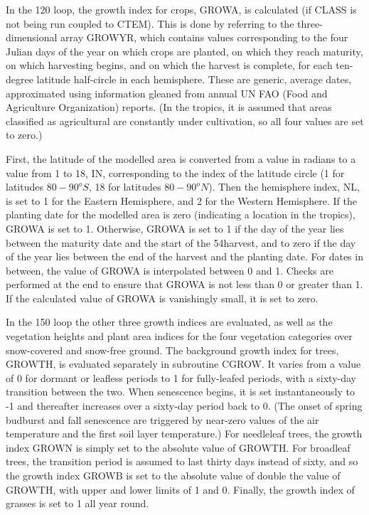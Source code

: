 In the 120 loop, the growth index for crops, G\+R\+O\+W\+A, is calculated (if C\+L\+A\+S\+S is not being run coupled to C\+T\+E\+M). This is done by referring to the three-\/dimensional array G\+R\+O\+W\+Y\+R, which contains values corresponding to the four Julian days of the year on which crops are planted, on which they reach maturity, on which harvesting begins, and on which the harvest is complete, for each ten-\/degree latitude half-\/circle in each hemisphere. These are generic, average dates, approximated using information gleaned from annual U\+N F\+A\+O (Food and Agriculture Organization) reports. (In the tropics, it is assumed that areas classified as agricultural are constantly under cultivation, so all four values are set to zero.)

First, the latitude of the modelled area is converted from a value in radians to a value from 1 to 18, I\+N, corresponding to the index of the latitude circle (1 for latitudes $80-90^o S$, 18 for latitudes $80-90^o N$). Then the hemisphere index, N\+L, is set to 1 for the Eastern Hemisphere, and 2 for the Western Hemisphere. If the planting date for the modelled area is zero (indicating a location in the tropics), G\+R\+O\+W\+A is set to 1. Otherwise, G\+R\+O\+W\+A is set to 1 if the day of the year lies between the maturity date and the start of the 54harvest, and to zero if the day of the year lies between the end of the harvest and the planting date. For dates in between, the value of G\+R\+O\+W\+A is interpolated between 0 and 1. Checks are performed at the end to ensure that G\+R\+O\+W\+A is not less than 0 or greater than 1. If the calculated value of G\+R\+O\+W\+A is vanishingly small, it is set to zero.

In the 150 loop the other three growth indices are evaluated, as well as the vegetation heights and plant area indices for the four vegetation categories over snow-\/covered and snow-\/free ground. The background growth index for trees, G\+R\+O\+W\+T\+H, is evaluated separately in subroutine C\+G\+R\+O\+W. It varies from a value of 0 for dormant or leafless periods to 1 for fully-\/leafed periods, with a sixty-\/day transition between the two. When senescence begins, it is set instantaneously to -\/1 and thereafter increases over a sixty-\/day period back to 0. (The onset of spring budburst and fall senescence are triggered by near-\/zero values of the air temperature and the first soil layer temperature.) For needleleaf trees, the growth index G\+R\+O\+W\+N is simply set to the absolute value of G\+R\+O\+W\+T\+H. For broadleaf trees, the transition period is assumed to last thirty days instead of sixty, and so the growth index G\+R\+O\+W\+B is set to the absolute value of double the value of G\+R\+O\+W\+T\+H, with upper and lower limits of 1 and 0. Finally, the growth index of grasses is set to 1 all year round.

